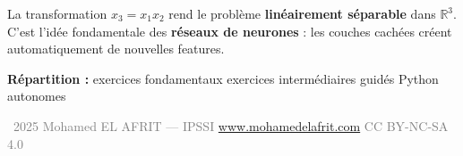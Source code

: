\begin{intuitionbox}[Indice]
    La transformation $x_3 = x_1 x_2$ rend le probl\`{e}me \textbf{lin\'{e}airement s\'{e}parable}
    dans $\mathbb{R}^3$. C'est l'id\'{e}e fondamentale des \textbf{r\'{e}seaux de neurones} :
    les couches cach\'{e}es cr\'{e}ent automatiquement de nouvelles features.
\end{intuitionbox}

\vfill
\separateur

\begin{center}
    \small\sffamily
    \textbf{R\'{e}partition :} exercices  fondamentaux  exercices  interm\'{e}diaires  guid\'{e}s Python   autonomes 
\end{center}

\begin{center}
    {\footnotesize\sffamily\textcolor{gray}{%
        \textcopyright\ 2025 Mohamed EL AFRIT --- IPSSI \enspace\textbullet\enspace
        \url{www.mohamedelafrit.com} \enspace\textbullet\enspace
        CC BY-NC-SA 4.0
    }}
\end{center}


